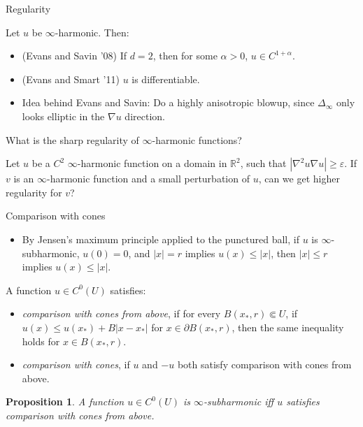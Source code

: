 \documentclass[10pt]{beamer}
\newcommand{\RR}{\mathbb{R}}
\newtheorem{proposition}{Proposition}
\begin{document}
\begin{frame}{Regularity}
\begin{theorem}
Let $u$ be $\infty$-harmonic. Then: 
\begin{itemize}
\item (Evans and Savin '08) If $d = 2$, then for some $\alpha > 0$, $u \in C^{1 + \alpha}$. 
\item (Evans and Smart '11) $u$ is differentiable. 
\end{itemize}
\end{theorem}

\begin{itemize}
    \item Idea behind Evans and Savin: Do a highly anisotropic blowup, since $\Delta_\infty$ only looks elliptic in the $\nabla u$ direction.
\end{itemize}

\begin{problem}
    What is the sharp regularity of $\infty$-harmonic functions?
\end{problem}

\begin{problem}
    Let $u$ be a $C^2$ $\infty$-harmonic function on a domain in $\RR^2$, such that $|\nabla^2 u \nabla u| \geq \varepsilon$.
    If $v$ is an $\infty$-harmonic function and a small perturbation of $u$, can we get higher regularity for $v$?
\end{problem}
\end{frame}

\begin{frame}{Comparison with cones}

\begin{itemize}
\item By Jensen's maximum principle applied to the punctured ball, if $u$ is $\infty$-subharmonic, $u(0) = 0$, and $|x| = r$ implies $u(x) \leq |x|$, then $|x| \leq r$ implies $u(x) \leq |x|$. 
\end{itemize}

\begin{definition}
A function $u \in C^0(U)$ satisfies: 
\begin{itemize}
\item \emph{comparison with cones from above}, if for every $B(x_*, r) \Subset U$, if $u(x) \leq u(x_*) + B|x - x_*|$ for $x \in \partial B(x_*, r)$, then the same inequality holds for $x \in B(x_*, r)$.
\item \emph{comparison with cones}, if $u$ and $-u$ both satisfy comparison with cones from above. 
\end{itemize}
\end{definition}

\begin{proposition}
A function $u \in C^0(U)$ is $\infty$-subharmonic iff $u$ satisfies comparison with cones from above.
\end{proposition}
\end{frame}
\end{document}

